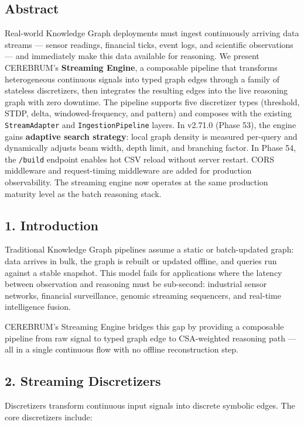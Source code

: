 
\subsection*{Abstract}
Real-world Knowledge Graph deployments must ingest continuously arriving data streams --- sensor readings, financial ticks, event logs, and scientific observations --- and immediately make this data available for reasoning. We present CEREBRUM's \textbf{Streaming Engine}, a composable pipeline that transforms heterogeneous continuous signals into typed graph edges through a family of stateless discretizers, then integrates the resulting edges into the live reasoning graph with zero downtime. The pipeline supports five discretizer types (threshold, STDP, delta, windowed-frequency, and pattern) and composes with the existing \texttt{StreamAdapter} and \texttt{IngestionPipeline} layers. In v2.71.0 (Phase 53), the engine gains \textbf{adaptive search strategy}: local graph density is measured per-query and dynamically adjusts beam width, depth limit, and branching factor. In Phase 54, the \texttt{/build} endpoint enables hot CSV reload without server restart. CORS middleware and request-timing middleware are added for production observability. The streaming engine now operates at the same production maturity level as the batch reasoning stack.

\subsection*{1. Introduction}
Traditional Knowledge Graph pipelines assume a static or batch-updated graph: data arrives in bulk, the graph is rebuilt or updated offline, and queries run against a stable snapshot. This model fails for applications where the latency between observation and reasoning must be sub-second: industrial sensor networks, financial surveillance, genomic streaming sequencers, and real-time intelligence fusion.

CEREBRUM's Streaming Engine bridges this gap by providing a composable pipeline from raw signal to typed graph edge to CSA-weighted reasoning path --- all in a single continuous flow with no offline reconstruction step.

\subsection*{2. Streaming Discretizers}
Discretizers transform continuous input signals into discrete symbolic edges. The core discretizers include:

